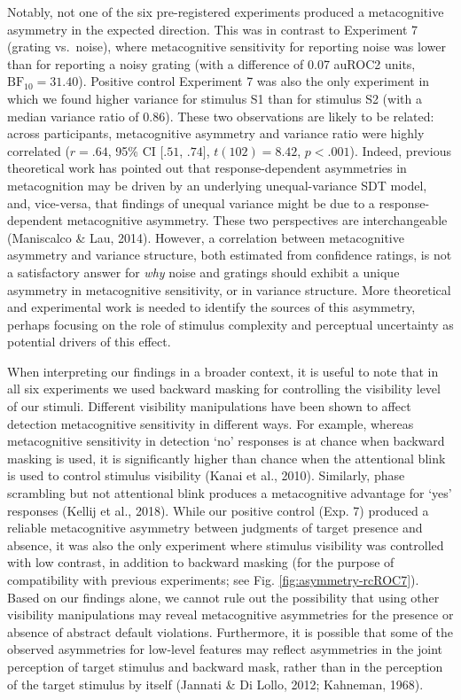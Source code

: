 \documentclass[12pt,twoside]{reedthesis}
\begin{document}
Notably, not one of the six pre-registered experiments produced a metacognitive asymmetry in the expected direction. This was in contrast to Experiment 7 (grating vs.~noise), where metacognitive sensitivity for reporting noise was lower than for reporting a noisy grating (with a difference of 0.07 auROC2 units, \(\mathrm{BF}_{\textrm{10}} = 31.40\)). Positive control Experiment 7 was also the only experiment in which we found higher variance for stimulus S1 than for stimulus S2 (with a median variance ratio of 0.86). These two observations are likely to be related: across participants, metacognitive asymmetry and variance ratio were highly correlated (\(r = .64\), 95\% CI \([.51\), \(.74]\), \(t(102) = 8.42\), \(p < .001\)). Indeed, previous theoretical work has pointed out that response-dependent asymmetries in metacognition may be driven by an underlying unequal-variance SDT model, and, vice-versa, that findings of unequal variance might be due to a response-dependent metacognitive asymmetry. These two perspectives are interchangeable (Maniscalco \& Lau, 2014). However, a correlation between metacognitive asymmetry and variance structure, both estimated from confidence ratings, is not a satisfactory answer for \emph{why} noise and gratings should exhibit a unique asymmetry in metacognitive sensitivity, or in variance structure. More theoretical and experimental work is needed to identify the sources of this asymmetry, perhaps focusing on the role of stimulus complexity and perceptual uncertainty as potential drivers of this effect.

When interpreting our findings in a broader context, it is useful to note that in all six experiments we used backward masking for controlling the visibility level of our stimuli. Different visibility manipulations have been shown to affect detection metacognitive sensitivity in different ways. For example, whereas metacognitive sensitivity in detection `no' responses is at chance when backward masking is used, it is significantly higher than chance when the attentional blink is used to control stimulus visibility (Kanai et al., 2010). Similarly, phase scrambling but not attentional blink produces a metacognitive advantage for `yes' responses (Kellij et al., 2018). While our positive control (Exp. 7) produced a reliable metacognitive asymmetry between judgments of target presence and absence, it was also the only experiment where stimulus visibility was controlled with low contrast, in addition to backward masking (for the purpose of compatibility with previous experiments; see Fig. \ref{fig:asymmetry-rcROC7}). Based on our findings alone, we cannot rule out the possibility that using other visibility manipulations may reveal metacognitive asymmetries for the presence or absence of abstract default violations. Furthermore, it is possible that some of the observed asymmetries for low-level features may reflect asymmetries in the joint perception of target stimulus and backward mask, rather than in the perception of the target stimulus by itself (Jannati \& Di Lollo, 2012; Kahneman, 1968).
\end{document}

